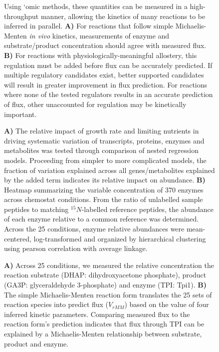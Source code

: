 \begin{figure}
\caption[We can infer \textit{in vivo} reaction kinetics if we have measured the reaction's rate and concentrations of enzymes and all relevant substrates, products and effectors.] { Using `omic methods, these quantities can be measured in a high-throughput manner, allowing the kinetics of many reactions to be inferred in parallel.  \textbf{A)} For reactions that follow simple Michaelis-Menten \textit{in vivo} kinetics, measurements of enzyme and substrate/product concentration should agree with measured flux.  \textbf{B)} For reactions with physiologically-meaningful allostery, this regulation must be added before flux can be accurately predicted.  If multiple regulatory candidates exist, better supported candidates will result in greater improvement in flux prediction.  For reactions where none of the tested regulators results in an accurate prediction of flux, other unaccounted for regulation may be kinetically important.}
\end{figure}

\begin{figure}
\caption[Summary of input data.]{ \textbf{A)} The relative impact of growth rate and limiting nutrients in driving systematic variation of transcripts, proteins, enzymes and metabolites was tested through comparison of nested regression models.  Proceeding from simpler to more complicated models, the fraction of variation explained across all genes/metabolites explained by the added term indicates its relative impact on abundance. \textbf{B)} Heatmap summarizing the variable concentration of 370 enzymes across chemostat conditions. From the ratio of unlabelled sample peptides to matching $^{15}N$-labelled reference peptides, the abundance of each enzyme relative to a common reference was determined.  Across the 25 conditions, enzyme relative abundances were mean-centered, log-transformed and organized by hierarchical clustering using pearson correlation with average linkage. }
\end{figure}

\begin{figure}
\caption[Michaelis-Menten kinetics is sufficient to relate substrate, product and enzyme concentrations to flux carried for the reaction triose-phosphate isomerase.] {\textbf{A)} Across 25 conditions, we measured the relative concentration the reaction substrate (DHAP: dihydroxyacetone phosphate), product (GA3P: glyceraldehyde 3-phosphate) and enzyme (TPI: Tpi1).  \textbf{B)} The simple Michaelis-Menten reaction form translates the 25 sets of reaction species into predict flux ($V_{rMM}$) based on the value of four inferred kinetic parameters.  Comparing measured flux to the reaction form's prediction indicates that flux through TPI can be explained by a Michaelis-Menten relationship between substrate, product and enzyme.}
\end{figure}

